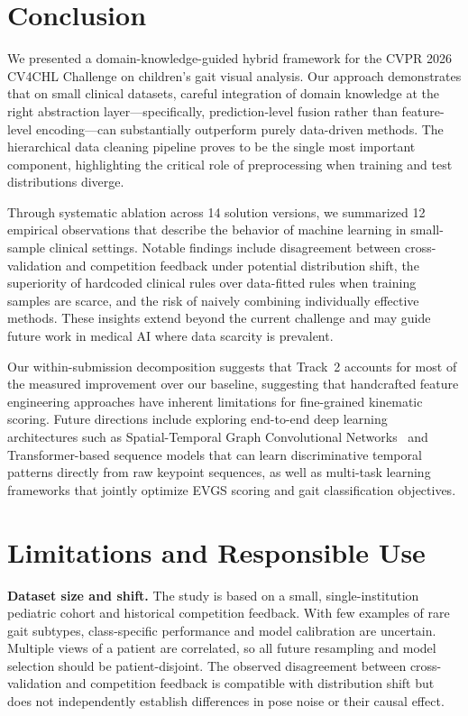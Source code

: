 \section{Conclusion}
\label{sec:conclusion}

We presented a domain-knowledge-guided hybrid framework for the CVPR 2026 CV4CHL Challenge on children's gait visual analysis. Our approach demonstrates that on small clinical datasets, careful integration of domain knowledge at the right abstraction layer---specifically, prediction-level fusion rather than feature-level encoding---can substantially outperform purely data-driven methods. The hierarchical data cleaning pipeline proves to be the single most important component, highlighting the critical role of preprocessing when training and test distributions diverge.

Through systematic ablation across 14 solution versions, we summarized 12 empirical observations that describe the behavior of machine learning in small-sample clinical settings. Notable findings include disagreement between cross-validation and competition feedback under potential distribution shift, the superiority of hardcoded clinical rules over data-fitted rules when training samples are scarce, and the risk of naively combining individually effective methods. These insights extend beyond the current challenge and may guide future work in medical AI where data scarcity is prevalent.

Our within-submission decomposition suggests that Track~2 accounts for most of the measured improvement over our baseline, suggesting that handcrafted feature engineering approaches have inherent limitations for fine-grained kinematic scoring. Future directions include exploring end-to-end deep learning architectures such as Spatial-Temporal Graph Convolutional Networks~\cite{yan2018spatial} and Transformer-based sequence models that can learn discriminative temporal patterns directly from raw keypoint sequences, as well as multi-task learning frameworks that jointly optimize EVGS scoring and gait classification objectives.


\section{Limitations and Responsible Use}
\label{sec:limitations}
\noindent\textbf{Dataset size and shift.}
The study is based on a small, single-institution pediatric cohort and historical competition feedback. With few examples of rare gait subtypes, class-specific performance and model calibration are uncertain. Multiple views of a patient are correlated, so all future resampling and model selection should be patient-disjoint. The observed disagreement between cross-validation and competition feedback is compatible with distribution shift but does not independently establish differences in pose noise or their causal effect.

